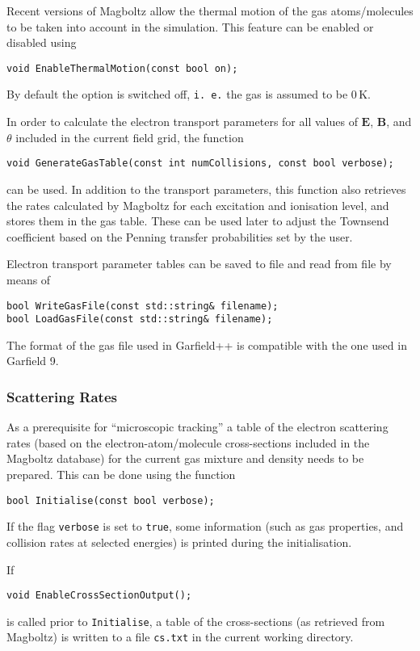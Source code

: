 Recent versions of Magboltz allow the thermal motion of the gas 
atoms/molecules to be taken into account in the simulation. 
This feature can be enabled or disabled using
\begin{lstlisting}
void EnableThermalMotion(const bool on);
\end{lstlisting} 
By default the option is switched off, \texttt{i. e.} the gas 
is assumed to be 0\,K. 

In order to calculate the electron transport parameters 
for all values of \(\mathbf{E}\), \(\mathbf{B}\), 
and \(\theta\) included in the current field grid, 
the function
\begin{lstlisting}
void GenerateGasTable(const int numCollisions, const bool verbose);
\end{lstlisting}
can be used. In addition to the transport parameters, this function also 
retrieves the rates calculated by Magboltz for each excitation and 
ionisation level, and stores them in the gas table. These can be used 
later to adjust the Townsend coefficient based on the Penning transfer 
probabilities set by the user.
 
Electron transport parameter tables can be saved to file 
and read from file by means of
\begin{lstlisting}
bool WriteGasFile(const std::string& filename);
bool LoadGasFile(const std::string& filename);
\end{lstlisting}

The format of the gas file used in Garfield++ is compatible with the 
one used in Garfield 9. 

\subsubsection{Scattering Rates}

As a prerequisite for ``microscopic tracking'' a 
table of the electron scattering rates 
(based on the electron-atom/molecule cross-sections included in the 
Magboltz database) for the 
current gas mixture and density needs to be prepared. 
This can be done using the function 
\begin{lstlisting}
bool Initialise(const bool verbose);
\end{lstlisting}
If the flag \texttt{verbose} is set to \texttt{true}, 
some information (such as gas properties, and collision rates at selected 
energies) is printed during the initialisation.  

If 
\begin{lstlisting}
void EnableCrossSectionOutput();
\end{lstlisting}
is called prior to \texttt{Initialise}, a table of the cross-sections 
(as retrieved from Magboltz) is written to a file \texttt{cs.txt} 
in the current working directory. 

